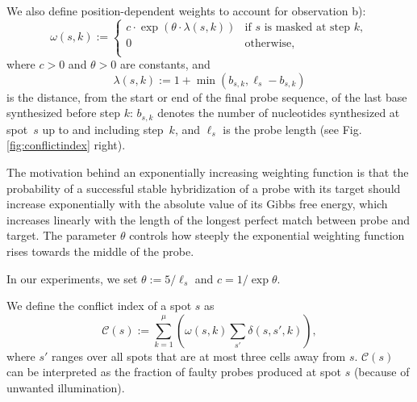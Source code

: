 \documentclass{llncs}
\newcommand{\ignore}[1]{}
\begin{document}
We also define position-dependent weights to account for observation b):
\begin{equation}\label{eq:pos_mult}
\omega(s,k) :=
\left\{
  \begin{array}{ll}
    c \cdot \exp{\left(\theta \cdot \lambda(s,k)\right)} & \mbox{if $s$ is masked at step $k$}, \\
    0 & \mbox{otherwise}, \\
  \end{array}
\right.
\end{equation}
where $c>0$ and $\theta>0$ are constants, and
\begin{equation}\label{eq:base_pos}
  \lambda(s,k) := 1 + \min(b_{s,k},\ell_{s} - b_{s,k})
\end{equation}
is the distance, from the start or end of the final probe sequence, of the
last base synthesized before step $k$: $b_{s,k}$ denotes the number of
nucleotides synthesized at spot~$s$ up to and including step~$k$, and
$\ell_s$ is the probe length (see Fig.\,\ref{fig:conflictindex}
right).

The motivation behind an exponentially increasing weighting function is that
the probability of a successful stable hybridization of a probe with its
target should increase exponentially with the absolute value of its Gibbs free
energy, which increases linearly with the length of the longest perfect match
between probe and target. The parameter $\theta$ controls how steeply the
exponential weighting function rises towards the middle of the probe.
%
\ignore{It is generally agreed that the chances of a successful hybridization
  between probe and target are higher if a mismatched base occurs at the
  extremities of the formed duplex instead of at its center. The precise
  effects of this position, however, is not yet fully understood and has been
  an active topic of research \cite{BINDER05}.}
%
In our experiments, we set $\theta := 5/\ell_s$ and $c = 1/\exp{\theta}$.


We define the conflict index of a spot $s$ as
\begin{equation}
\label{eq:conf_idx}
\mathcal{C}(s) := \sum_{k=1}^{\mu} \left( \omega(s,k) \sum_{s'} \delta(s,s',k) \right),
\end{equation}
where $s'$ ranges over all spots that are at most three cells away
from $s$.  $\mathcal{C}(s)$ can be interpreted as the fraction of
faulty probes produced at spot $s$ (because of unwanted illumination).
\end{document}
